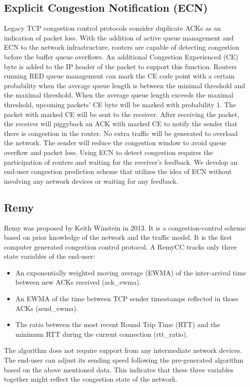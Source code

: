 \subsection{Explicit Congestion Notification (ECN)}
\par Legacy TCP congestion control protocols consider duplicate ACKs as an indication of packet loss. With the addition of active queue management and ECN \cite{ramakrishnan2001rfc} to the network infrastructure, routers are capable of detecting congestion before the buffer queue overflows. An additional Congestion Experienced (CE) byte is added to the IP header of the packet to support this function. Routers running RED queue management can mark the CE code point with a certain probability when the average queue length is between the minimal threshold and the maximal threshold. When the average queue length exceeds the maximal threshold, upcoming packets' CE byte will be marked with probability $1$. The packet with marked CE will be sent to the receiver. After receiving the packet, the receiver will piggyback an ACK with marked CE to notify the sender that there is congestion in the router. No extra traffic will be generated to overload the network. The sender will reduce the congestion window to avoid queue overflow and packet loss. Using ECN to detect congestion requires the participation of routers and waiting for the receiver's feedback. We develop an end-user congestion prediction scheme that utilizes the idea of ECN without involving any network devices or waiting for any feedback.
\subsection{Remy}
\par Remy \cite{winstein2013tcp} was proposed by Keith Winstein in 2013. It is a congestion-control scheme based on prior knowledge of the network and the traffic model. It is the first computer generated congestion control protocol. A RemyCC tracks only three state variables of the end-user:
\begin{itemize}
\item An exponentially weighted moving average (EWMA) of the inter-arrival time between new ACKs received (ack\_ewma).
\item An EWMA of the time between TCP sender timestamps reflected in those ACKs (send\_ewma).
\item The ratio between the most recent Round Trip Time (RTT) and the minimum RTT during the current connection (rtt\_ratio).
\end{itemize}
The algorithm does not require support from any intermediate network devices. The end-user can adjust its sending speed following the pre-generated algorithm based on the above mentioned data. This indicates that these three variables together might reflect the congestion state of the network. 


